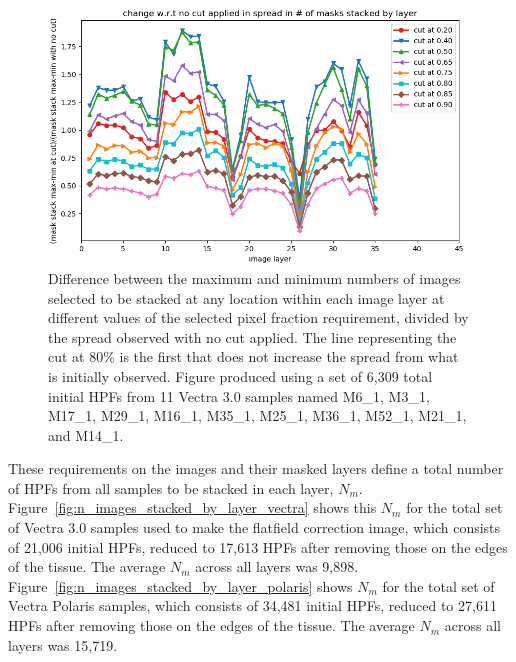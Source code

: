 \documentclass[letterpaper,11pt]{article}
\newcommand{\reffig}[1]{Figure~\ref{#1}}
\begin{document}
\begin{figure}[!ht]
\centering
\includegraphics[width=0.98\textwidth]{images/measuring_flatfield_corrections/example_mask_stack_spreads_by_layer}
\caption{\footnotesize Difference between the maximum and minimum numbers of images selected to be stacked at any location within each image layer at different values of the selected pixel fraction requirement, divided by the spread observed with no cut applied. The line representing the cut at 80\% is the first that does not increase the spread from what is initially observed. Figure produced using a set of 6,309 total initial HPFs from 11 Vectra 3.0 samples named M6\_1, M3\_1, M17\_1, M29\_1, M16\_1, M35\_1, M25\_1, M36\_1, M52\_1, M21\_1, and M14\_1.}
\label{fig:selected_pixel_fraction_cut_2}
\end{figure} 

These requirements on the images and their masked layers define a total number of HPFs from all samples to be stacked in each layer, $N_{m}$. \reffig{fig:n_images_stacked_by_layer_vectra} shows this $N_{m}$ for the total set of Vectra 3.0 samples used to make the flatfield correction image, which consists of 21,006 initial HPFs, reduced to 17,613 HPFs after removing those on the edges of the tissue. The average $N_{m}$ across all layers was 9,898. \reffig{fig:n_images_stacked_by_layer_polaris} shows $N_{m}$ for the total set of Vectra Polaris samples, which consists of 34,481 initial HPFs, reduced to 27,611 HPFs after removing those on the edges of the tissue. The average $N_{m}$ across all layers was 15,719.
\end{document}
